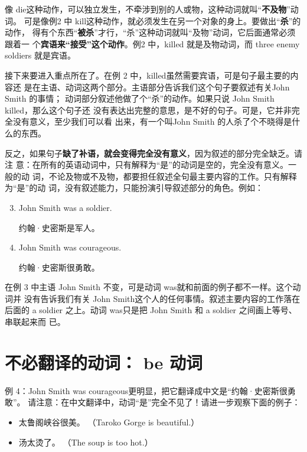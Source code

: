 \documentclass{yufa}
\begin{document}
像 die这种动作，可以独立发生，不牵涉到别的人或物，这种动词就叫“\textbf{不及物}”动词。
可是像例2 中 kill这种动作，就必须发生在另一个对象的身上。要做出“\textbf{杀}”的动作，
得有个东西“\textbf{被杀}”才行，“杀”这种动词就叫“及物”动词，它后面通常必须跟着一
个\textbf{宾语来“接受”这个动作}。例2 中，killed 就是及物动词，而 three enemy
soldiers 就是宾语。

接下来要进入重点所在了。在例 2 中，killed虽然需要宾语，可是句子最主要的内容还
是在主语、动词这两个部分。主语部分告诉我们这个句子要叙述有关John Smith 的事情；
动词部分叙述他做了个“杀”的动作。如果只说 John Smith killed，那么这个句子还
没有表达出完整的意思，是不好的句子。可是，它并非完全没有意义，至少我们可以看
出来，有一个叫John Smith 的人杀了个不晓得是什么的东西。

反之，如果句子\textbf{缺了补语，就会变得完全没有意义}，因为叙述的部分完全缺乏。请注
意：在所有的英语动词中，只有解释为“是”的动词是空的，完全没有意义。一般的动
词，不论及物或不及物，都要担任叙述全句最主要内容的工作。只有解释为“是”的动
词，没有叙述能力，只能扮演引导叙述部分的角色。例如：

\begin{enumerate}
  \setcounter{enumi}{2}
\item John Smith was a soldier.

  约翰·史密斯是军人。
\item John Smith was courageous.

  约翰·史密斯很勇敢。
\end{enumerate}

在例 3 中主语 John Smith 不变，可是动词 was就和前面的例子都不一样。这个动词并
没有告诉我们有关 John Smith这个人的任何事情。叙述主要内容的工作落在后面的 a
soldier 之上。动词 was只是把 John Smith 和 a soldier 之间画上等号、串联起来而
已。

\section{不必翻译的动词： be 动词}

例 4：John Smith was courageous更明显，把它翻译成中文是“约翰·史密斯很勇敢”。
请注意：在中文翻译中，动词“是”完全不见了！请进一步观察下面的例子：

\begin{itemize}
\item 太鲁阁峡谷很美。 （Taroko Gorge is beautiful.）
\item 汤太烫了。 （The soup is too hot.）
\end{itemize}
\end{document}
